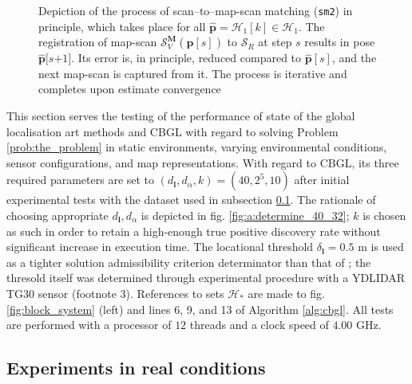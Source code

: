 \begin{figure}\vspace{1cm}
  
  \caption{\small Depiction of the process of scan--to--map-scan matching
           (\texttt{sm2}) in principle, which takes place for all $\hat{\bm{p}}
           = \mathcal{H}_1[k] \in \mathcal{H}_1$. The registration of map-scan
           $\mathcal{S}_V^{\bm{M}}(\hat{\bm{p}}[s])$ to $\mathcal{S}_R$ at step
           $s$ results in pose $\hat{\bm{p}}[s$$+$$1]$. Its error is, in
           principle, reduced compared to $\hat{\bm{p}}[s]$, and the next
           map-scan is captured from it. The process is iterative and completes
           upon estimate convergence}
  \label{fig:sm2_evolution}
\end{figure}

This section serves the testing of the performance of state of the global
localisation art methods and CBGL with regard to solving Problem
\ref{prob:the_problem} in static environments, varying environmental
conditions, sensor configurations, and map representations. With regard to CBGL,
its three required parameters are set to $(d_{\bm{l}},d_{\alpha},k) = (40, 2^5,
10)$ after initial experimental tests with the dataset used in subsection
\ref{subsec:exp_a}. The rationale of choosing appropriate
$d_{\bm{l}},d_{\alpha}$ is depicted in fig. \ref{fig:a:determine_40_32};
$k$ is chosen as such in order to retain a high-enough true positive discovery
rate without significant increase in execution time. The locational threshold
$\delta_{\bm{l}} = 0.5$ m is used as a tighter solution admissibility criterion
determinator than that of \cite{Filotheou2022g}; the thresold itself was
determined through experimental procedure with a YDLIDAR TG30 sensor (footnote
3).
References to sets $\mathcal{H}_{\ast}$ are made to fig. \ref{fig:block_system}
(left) and lines
6, 9, and 13 of Algorithm
\ref{alg:cbgl}.
All tests are performed with a processor of $12$
threads and a clock speed of $4.00$ GHz.


\subsection{Experiments in real conditions}
\label{subsec:exp_a}

